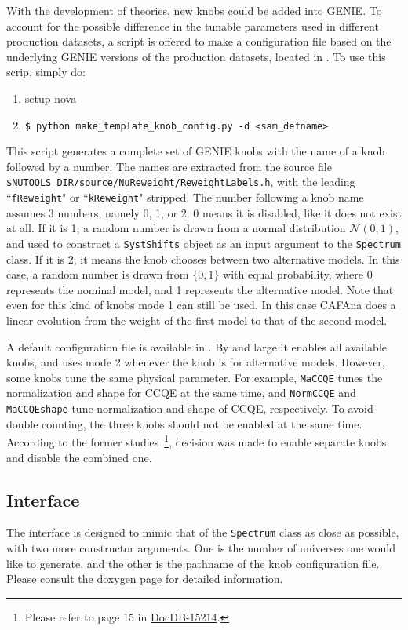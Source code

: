 \documentclass[12pt,a4paper,final]{iopart}
\begin{document}
With the development of theories, new knobs could be added into GENIE. To account for the possible difference in the tunable parameters used in different production datasets, a script is offered to make a configuration file based on the underlying GENIE versions of the production datasets, located in . To use this scrip, simply do:
\begin{enumerate}
  \item setup nova
  \item \texttt{\$ python make\_template\_knob\_config.py -d \textless sam\_defname\textgreater}
\end{enumerate}
This script generates a complete set of GENIE knobs with the name of a knob followed by a number. The names are extracted from the source file \texttt{\$NUTOOLS\_DIR/source/NuReweight/ReweightLabels.h}, with the leading ``\texttt{fReweight}" or ``\texttt{kReweight}" stripped. The number following a knob name assumes 3 numbers, namely 0, 1, or 2. 0 means it is disabled, like it does not exist at all. If it is 1, a random number is drawn from a normal distribution $\mathcal{N}(0,1)$, and used to construct a \texttt{SystShifts} object as an input argument to the \texttt{Spectrum} class. If it is 2, it means the knob chooses between two alternative models. In this case, a random number is drawn from $\{0,1\}$ with equal probability, where 0 represents the nominal model, and 1 represents the alternative model. Note that even for this kind of knobs mode 1 can still be used. In this case CAFAna does a linear evolution from the weight of the first model to that of the second model.

A default configuration file is available in . By and large it enables all available knobs, and uses mode 2 whenever the knob is for alternative models. However, some knobs tune the same physical parameter. For example, \texttt{MaCCQE} tunes the normalization and shape for CCQE at the same time, and \texttt{NormCCQE} and \texttt{MaCCQEshape} tune normalization and shape of CCQE, respectively. To avoid double counting, the three knobs should not be enabled at the same time. According to the former studies~\footnote{Please refer to page 15 in \href{https://nova-docdb.fnal.gov:441/cgi-bin/ShowDocument?docid=15214}{DocDB-15214}.}, decision was made to enable separate knobs and disable the combined one.

\subsection{Interface}
The interface is designed to mimic that of the \texttt{Spectrum} class as close as possible, with two more constructor arguments. One is the number of universes one would like to generate, and the other is the pathname of the knob configuration file. Please consult the \href{http://nusoft.fnal.gov/nova/novasoft/doxygen/html/classana_1_1MultiverseSpectra.html}{doxygen page} for detailed information.
\end{document}
